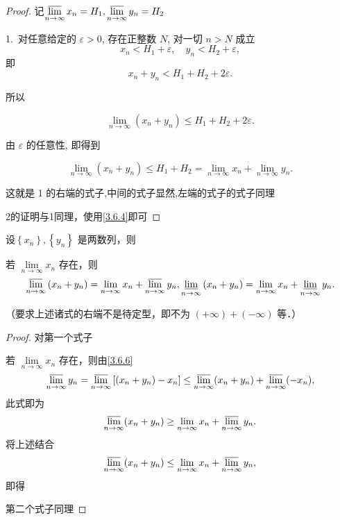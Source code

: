\begin{proof}
	记$\varlimsup\limits_{n\rightarrow\infty}x_{n}=H_1,\varlimsup\limits_{n\rightarrow\infty}y_{n}=H_2$
	
	1.~对任意给定的 \(\varepsilon > 0\), 存在正整数 \(N\), 对一切 \(n > N\) 成立
	\[
	x_n < H_1 + \varepsilon, \quad y_n < H_2 + \varepsilon,
	\]
	即
	\[
	x_n + y_n < H_1 + H_2 + 2\varepsilon.
	\]
	
	所以
	
	\[
	\lim_{n \to \infty} (x_n + y_n) \leq H_1 + H_2 + 2\varepsilon.
	\]
	
	由 \(\varepsilon\) 的任意性, 即得到
	
	\[
	\lim_{n \to \infty} (x_n + y_n) \leq H_1 + H_2 = \lim_{n \to \infty} x_n + \lim_{n \to \infty} y_n.
	\]
	
	这就是 1 的右端的式子,中间的式子显然,左端的式子的式子同理
	
	2的证明与1同理，使用\ref{3.6.4}即可
\end{proof}
\begin{proposition}
	设$\left\{x_n\right\},\left\{y_n\right\}$ 是两数列，则
	
	若 $\lim\limits_{n \rightarrow \infty} x_n$ 存在，则
	$$
	\varlimsup_{n \rightarrow \infty}\left(x_n+y_n\right)=\lim _{n \rightarrow \infty} x_n+\varlimsup_{n \rightarrow \infty} y_n, \varliminf\limits_{n \rightarrow \infty}\left(x_n+y_n\right)=\lim _{n \rightarrow \infty} x_n+\varliminf\limits_{n \rightarrow \infty} y_n .
	$$
	
	（要求上述诸式的右端不是待定型，即不为 $(+\infty)+(-\infty)$ 等．）
\end{proposition}
\begin{proof}
	对第一个式子
	
	若 \(\lim\limits_{n \to \infty} x_n\) 存在，则由\ref{3.6.6} 
	\[
	\varlimsup\limits_{n \to \infty} y_n = \varlimsup\limits_{n \to \infty} \left[ (x_n + y_n) - x_n \right] \leq \varlimsup\limits_{n \to \infty} (x_n + y_n) + \varlimsup\limits_{n \to \infty} (-x_n),
	\]
	此式即为
	\[
	\varlimsup\limits_{n \to \infty} (x_n + y_n) \geq \lim_{n \to \infty} x_n + \varlimsup\limits_{n \to \infty} y_n.
	\]
	将上述结合
	\[
	\varlimsup\limits_{n \to \infty} (x_n + y_n) \leq \lim_{n \to \infty} x_n + \varlimsup\limits_{n \to \infty} y_n,
	\]
	即得
	
	第二个式子同理
\end{proof}
